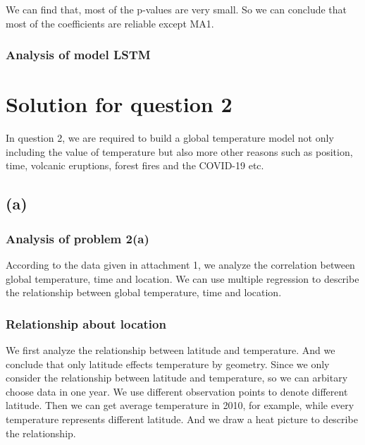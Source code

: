\documentclass{apmcmthesis}
\begin{document}
We can find that, most of the p-values are very small.
So we can conclude that most of the coefficients are reliable except MA{1}.

\subsubsection{Analysis of model LSTM}


\section{Solution for question 2}
In question 2, we are required to build a global temperature model not only including the value of temperature 
but also more other reasons such as position, time, volcanic eruptions, forest fires and the COVID-19 etc.

\subsection{(a)}
\subsubsection{Analysis of problem 2(a)}
According to the data given in attachment 1, we analyze the correlation between global temperature, time and location.
We can use multiple regression to describe the relationship between global temperature, time and location. 

\subsubsection{Relationship about location}
We first analyze the relationship between latitude and temperature. 
And we conclude that only latitude effects temperature by geometry.
Since we only consider the relationship between latitude and temperature, so we can arbitary choose data in one year.
We use different observation points to denote different latitude.
Then we can get average temperature in 2010, for example, while every temperature represents different latitude. 
And we draw a heat picture to describe the relationship.
\end{document}
